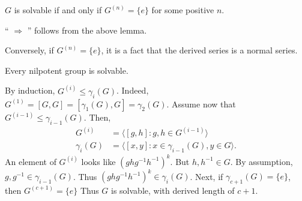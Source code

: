 \documentclass[12pt]{report}
\begin{document}
\begin{theorem}
$G$ is solvable if and only if $G^{(n)} = \{e\}$ for some positive $n$.
\end{theorem}
\proof
`` $\Rightarrow$ '' follows from the above lemma.

Conversely, if $G^{(n)} = \{e\}$, it is a fact that the derived series is a normal series.
\done

\begin{proposition}
Every nilpotent group is solvable.
\end{proposition}
\proof
By induction, $G^{(i)} \leq \gamma_i (G)$.  Indeed, $G^{(1)} = [G,G] = [\gamma_1(G), G]
= \gamma_2(G)$.  Assume now that $G^{(i-1)} \leq \gamma_{i-1}(G)$.  Then,
\begin{align*}
G^{(i)} &= \langle[g,h]: g,h\in G^{(i-1)} \rangle\\
\gamma_i (G) &= \langle[x,y]:x\in \gamma_{i-1}(G),y\in G\rangle.
\end{align*}
An element of $G^{(i)}$ looks like $(ghg^{-1}h^{-1})^k$.  But $h,h^{-1}\in G$.
By assumption, $g,g^{-1}\in \gamma_{i-1}(G)$.  Thus $(ghg^{-1}h^{-1})^k \in \gamma_i(G)$.
Next, if $\gamma_{c+1}(G) = \{e\}$, then $G^{(c+1)} = \{e\}$  Thus $G$ is solvable, with
derived length of $c+1$.
\done
\end{document}
